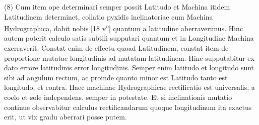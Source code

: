 \pend
\pstart\noindent\hangindent=10mm (8) Cum item ope \protect{} determinari semper possit Latitudo  et Machina itidem Latitudinem\protect{} determinet,  collatio pyxidis\protect{} inclinatoriae cum Machina Hydrographica\protect{}, dabit nobis 
[18 v\textsuperscript{o}] quantum a latitudine\protect{} aberraverimus. Hinc autem poterit calculo satis subtili supputari quantum et in Longitudine\protect{} Machina exerraverit. Constat enim de effectu quoad Latitudinem\protect{}, constat item de proportione mutatae longitudinis\protect{} ad mutatam latitudinem\protect{}. Hinc supputabitur ex dato errore latitudinis\protect{} error longitudinis\protect{}. Semper enim latitudo\protect{} et longitudo\protect{} sunt sibi  ad angulum rectum, ac proinde quanto minor est Latitudo\protect{} tanto  est longitudo\protect{}, et contra. Haec machinae Hydrographicae\protect{} rectificatio est universalis, a coelo et sole\protect{} independens, semper in potestate. Et si inclinationis\protect{} mutatio continue observabitur calculus rectificandarum quoque longitudinum\protect{} ita exactus erit, ut vix gradu aberrari posse putem.\pend